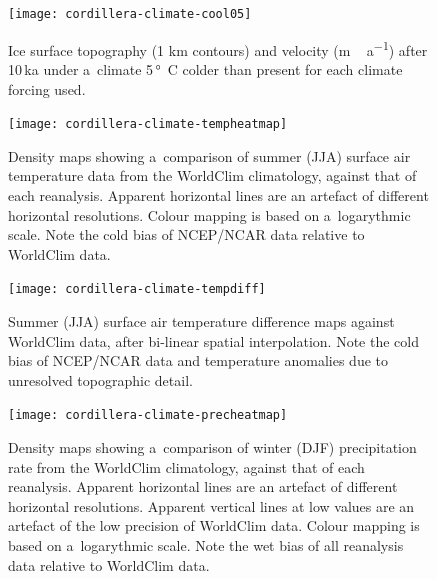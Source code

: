 \documentclass[tc, ms]{copernicus}
\begin{document}
\begin{figure}[t]
	\vspace*{2mm}
	\begin{center}
		\texttt{[image: cordillera-climate-cool05]}
	\end{center}
	\caption{Ice surface topography (1 km contours) and velocity (\unit{m\,a^{-1}}) after 10\,ka under a~climate 5\,\unit{\degree C} colder than present for each climate forcing used.}
	\label{fig:cool05}
\end{figure}

\begin{figure}[t]
	\vspace*{2mm}
	\begin{center}
		\texttt{[image: cordillera-climate-tempheatmap]}
	\end{center}
	\caption{Density maps showing a~comparison of summer (JJA) surface air temperature data from the WorldClim climatology, against that of each reanalysis. Apparent horizontal lines are an artefact of different horizontal resolutions. Colour mapping is based on a~logarythmic scale. Note the cold bias of NCEP/NCAR data relative to WorldClim data.}
	\label{fig:tempheatmap}
\end{figure}

\begin{figure}[t]
	\vspace*{2mm}
	\begin{center}
		\texttt{[image: cordillera-climate-tempdiff]}
	\end{center}
	\caption{Summer (JJA) surface air temperature difference maps against WorldClim data, after bi-linear spatial interpolation. Note the cold bias of NCEP/NCAR data and temperature anomalies due to unresolved topographic detail.}
	\label{fig:tempdiff}
\end{figure}

\begin{figure}[t]
	\vspace*{2mm}
	\begin{center}
		\texttt{[image: cordillera-climate-precheatmap]}
	\end{center}
	\caption{Density maps showing a~comparison of winter (DJF) precipitation rate from the WorldClim climatology, against that of each reanalysis. Apparent horizontal lines are an artefact of different horizontal resolutions. Apparent vertical lines at low values are an artefact of the low precision of WorldClim data. Colour mapping is based on a~logarythmic scale. Note the wet bias of all reanalysis data relative to WorldClim data.}
	\label{fig:precheatmap}
\end{figure}
\end{document}
